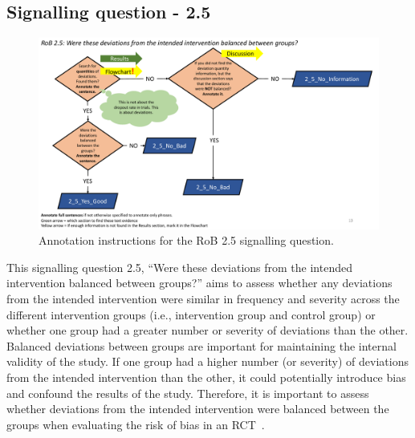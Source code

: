 \documentclass[sn-mathphys,Numbered]{sn-jnl}%
\begin{document}
\subsection*{Signalling question - 2.5 }
%
%
%
\begin{figure}[hbt]
    \centering
    \includegraphics[width=\textwidth]{figures/2_5.pdf}
    \caption{Annotation instructions for the RoB 2.5 signalling question.}
    \label{fig:2_5}
\end{figure}
%
%
%
This signalling question 2.5, ``Were these deviations from the intended intervention balanced between groups?'' aims to assess whether any deviations from the intended intervention were similar in frequency and severity across the different intervention groups (i.e., intervention group and control group) or whether one group had a greater number or severity of deviations than the other.
Balanced deviations between groups are important for maintaining the internal validity of the study.
If one group had a higher number (or severity) of deviations from the intended intervention than the other, it could potentially introduce bias and confound the results of the study.
Therefore, it is important to assess whether deviations from the intended intervention were balanced between the groups when evaluating the risk of bias in an RCT~\cite{rozenfeld2006effect}.
\end{document}
